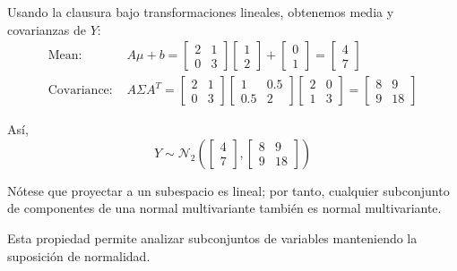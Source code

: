 \documentclass[
  11pt,
  ignorenonframetext,
  aspectratio=169]{beamer}
\theoremstyle{plain}
\theoremstyle{definition}
\theoremstyle{remark}
\begin{document}
\begin{frame}{}
\label{section-14}
\begin{example}

Usando la clausura bajo transformaciones lineales, obtenemos media y covarianzas de $Y$:
\begin{align*} 
\text{Mean: } & A\mu + b = \begin{bmatrix} 2 & 1 \\ 0 & 3 \end{bmatrix} \begin{bmatrix} 1 \\ 2 \end{bmatrix} + \begin{bmatrix} 0 \\ 1 \end{bmatrix} = \begin{bmatrix} 4 \\ 7 \end{bmatrix} \\ 
\text{Covariance: } & A\Sigma A^{T} = \begin{bmatrix} 2 & 1 \\ 0 & 3 \end{bmatrix} \begin{bmatrix} 1 & 0.5 \\ 0.5 & 2 \end{bmatrix} \begin{bmatrix} 2 & 0 \\ 1 & 3 \end{bmatrix} = \begin{bmatrix} 8 & 9 \\ 9 & 18 \end{bmatrix} 
\end{align*} 

\pause

Así,  
$$Y \sim \mathcal{N}_{2}\left(\begin{bmatrix} 4 \\ 7 \end{bmatrix}, \begin{bmatrix} 8 & 9 \\ 9 & 18 \end{bmatrix}\right)
$$ 
\end{example}
\end{frame}

\begin{frame}{}
\label{section-15}
\begin{remark} Nótese que proyectar a un subespacio es lineal; por tanto, cualquier subconjunto de componentes de una normal multivariante también es normal multivariante.

\bigpause

Esta propiedad permite analizar subconjuntos de variables manteniendo la suposición de normalidad. 
\end{remark}
\end{frame}
\end{document}
